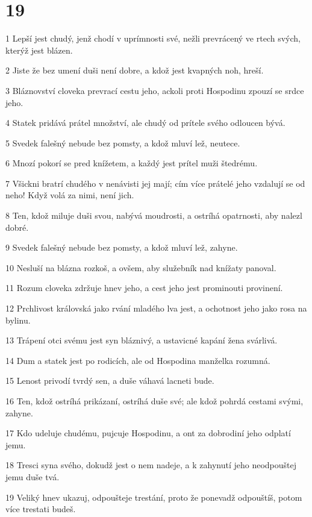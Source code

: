 \chapter{19}

\par 1 Lepší jest chudý, jenž chodí v uprímnosti své, nežli prevrácený ve rtech svých, kterýž jest blázen.
\par 2 Jiste že bez umení duši není dobre, a kdož jest kvapných noh, hreší.
\par 3 Bláznovství cloveka prevrací cestu jeho, ackoli proti Hospodinu zpouzí se srdce jeho.
\par 4 Statek pridává prátel množství, ale chudý od prítele svého odloucen bývá.
\par 5 Svedek falešný nebude bez pomsty, a kdož mluví lež, neutece.
\par 6 Mnozí pokorí se pred knížetem, a každý jest prítel muži štedrému.
\par 7 Všickni bratrí chudého v nenávisti jej mají; cím více prátelé jeho vzdalují se od neho! Když volá za nimi, není jich.
\par 8 Ten, kdož miluje duši svou, nabývá moudrosti, a ostríhá opatrnosti, aby nalezl dobré.
\par 9 Svedek falešný nebude bez pomsty, a kdož mluví lež, zahyne.
\par 10 Nesluší na blázna rozkoš, a ovšem, aby služebník nad knížaty panoval.
\par 11 Rozum cloveka zdržuje hnev jeho, a cest jeho jest prominouti provinení.
\par 12 Prchlivost královská jako rvání mladého lva jest, a ochotnost jeho jako rosa na bylinu.
\par 13 Trápení otci svému jest syn bláznivý, a ustavicné kapání žena svárlivá.
\par 14 Dum a statek jest po rodicích, ale od Hospodina manželka rozumná.
\par 15 Lenost privodí tvrdý sen, a duše váhavá lacneti bude.
\par 16 Ten, kdož ostríhá prikázaní, ostríhá duše své; ale kdož pohrdá cestami svými, zahyne.
\par 17 Kdo udeluje chudému, pujcuje Hospodinu, a ont za dobrodiní jeho odplatí jemu.
\par 18 Tresci syna svého, dokudž jest o nem nadeje, a k zahynutí jeho neodpouštej jemu duše tvá.
\par 19 Veliký hnev ukazuj, odpoušteje trestání, proto že ponevadž odpouštíš, potom více trestati budeš.
